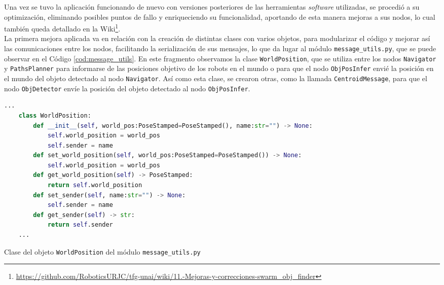 Una vez se tuvo la aplicación funcionando de nuevo con versiones posteriores de
las herramientas \textit{software} utilizadas, se procedió a su optimización,
eliminando posibles puntos de fallo y enriqueciendo su funcionalidad, aportando
de esta manera mejoras a sus nodos, lo cual también queda detallado en la
Wiki\footnote{
\href{https://github.com/RoboticsURJC/tfg-unai/wiki/11.-Mejoras-y-correcciones-del-swarm\_obj\_finder-\%5B30-Sep-\%E2\%80\%90-9-Nov\%5D}{https://github.com/RoboticsURJC/tfg-unai/wiki/11.-Mejoras-y-correcciones-swarm\_obj\_finder}}.
\\

La primera mejora aplicada va en relación con la creación de distintas clases
con varios objetos, para modularizar el código y mejorar así las comunicaciones
entre los nodos, facilitando la serialización de sus mensajes, lo que da lugar
al módulo \texttt{message\_utils.py}, que se puede observar en el Código
\ref{cod:message_utils}.
En este fragmento observamos la clase \verb|WorldPosition|, que se utiliza
entre los nodos \verb|Navigator| y \verb|PathsPlanner| para informarse de
las posiciones objetivo de los robots en el mundo o para que el nodo
\verb|ObjPosInfer| envié la posición en el mundo del objeto detectado al nodo
\verb|Navigator|.
Así como esta clase, se crearon otras, como la llamada \verb|CentroidMessage|,
para que el nodo \verb|ObjDetector| envíe la posición del objeto detectado al
nodo \verb|ObjPosInfer|.
\\

\begin{code}[h!]
  \begin{lstlisting}[language=Python]
    ...
    class WorldPosition:
        def __init__(self, world_pos:PoseStamped=PoseStamped(), name:str="") -> None:
            self.world_position = world_pos
            self.sender = name
        def set_world_position(self, world_pos:PoseStamped=PoseStamped()) -> None:
            self.world_position = world_pos
        def get_world_position(self) -> PoseStamped:
            return self.world_position
        def set_sender(self, name:str="") -> None:
            self.sender = name
        def get_sender(self) -> str:
            return self.sender
    ...
  \end{lstlisting}
\caption[Clase del objeto \texttt{WorldPosition} del módulo \texttt{message\_utils.py}]{Clase del objeto \texttt{WorldPosition} del módulo \texttt{message\_utils.py}}
\label{cod:message_utils}
\end{code}

